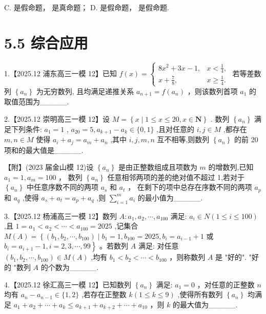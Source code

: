 \documentclass[10pt]{article}
\newcommand*\circled[1]{\tikz[baseline=(char.base)]{\node[shape=circle,draw,inner sep=1.5pt] (char) {\small #1};}}
\begin{document}
C.  \circled{1} 是假命题， \circled{2} 是真命题； D.  \circled{1} 是假命题， \circled{2} 是假命题.

\section*{5.5 综合应用}

1.【2025.12 浦东高三一模 12】已知 \(f\left( x\right)  = \left\{  \begin{array}{ll} 8{x}^{2} + {3x} - 1, & x < \frac{1}{4}, \\  x + \frac{7}{8}, & x \geq  \frac{1}{4}. \end{array}\right.\) 若等差数列 \(\left\{  {a}_{n}\right\}\) 为无穷数列, 且均满足递推关系 \({a}_{n + 1} = f\left( {a}_{n}\right)\) ，则该数列首项 \({a}_{1}\) 的取值范围为\_\_\_\_\_.

2.【2025.12 崇明高三一模 12】设 \(M = \left\{  {x \mid  1 \leq  x \leq  {20},x \in  \mathbf{N}}\right\}\) . 数列 \(\left\{  {a}_{n}\right\}\) 满足下列条件: \({a}_{1} = 1\) , \({a}_{20} = 5,{a}_{k + 1} - {a}_{k} \in  \{ 0,1\}\) ,且对任意的 \(i,j \in  M\) ,都存在 \(m,n \in  M\) 使得 \({a}_{i} + {a}_{j} = {a}_{m} + {a}_{n}\) ,其中 \(i,j,m,n\) 互不相等,则数列 \(\left\{  {a}_{n}\right\}\) 的前 20 项和的最大值是\_\_\_\_\_.

【附】(2023 届金山模 12)设 \(\left\{  {a}_{n}\right\}\) 是由正整数组成且项数为 \(m\) 的增数列,已知 \({a}_{1} = 1,{a}_{m} = {100}\) ， 数列 \(\left\{  {a}_{n}\right\}\) 任意相邻两项的差的绝对值不超过 1,若对于 \(\left\{  {a}_{n}\right\}\) 中任意序数不同的两项 \({a}_{s}\) 和 \({a}_{t}\) ， 在剩下的项中总存在序数不同的两项 \({a}_{p}\) 和 \({a}_{q}\) ,使得 \({a}_{s} + {a}_{t} = {a}_{p} + {a}_{q}\) ,则 \(\mathop{\sum }\limits_{{i = 1}}^{m}{a}_{i}\) 的最小值为\_\_\_\_\_.

3.【2025.12 杨浦高三一模 12】数列 \(A : {a}_{1},{a}_{2},\cdots ,{a}_{100}\) 满足: \({a}_{i} \in  N\left( {1 \leq  i \leq  {100}}\right)\) ,且 \(1 = {a}_{1} < {a}_{2} < \cdots  < {a}_{100} = {2025}\) ,记集合 \(M\left( A\right)  = \left\{  {\left( {{b}_{1},{b}_{2},\cdots ,{b}_{100}}\right)  \mid  {b}_{1} = 1,{b}_{100} = {2025},{b}_{i} = {a}_{i - 1} + 1}\right.\) 或 \(\left. {{b}_{i} = {a}_{i + 1} - 1,i = 2,3,\cdots ,{99}}\right\}\) 。若数列 \(A\) 满足: 对任意 \(\left( {{b}_{1},{b}_{2},\cdots ,{b}_{100}}\right)  \in  M\left( A\right)\) ,均有 \({b}_{1} < {b}_{2} < \cdots  < {b}_{100}\) ，则称数列 \(A\) 是 "好的". "好的 "数列 \(A\) 的个数为\_\_\_\_\_.

4.【2025.12 徐汇高三一模 12】已知数列 \(\left\{  {a}_{n}\right\}\) 满足: \({a}_{1} = 0\) ，对任意的正整数 \(n\) 均有 \({a}_{n} - {a}_{n - 1} \in  \{ 1,2\}\) ,若存在正整数 \(k\left( {1 \leq  k \leq  9}\right)\) ,使得所有数列 \(\left\{  {a}_{n}\right\}\) 均满足 \({a}_{1} + {a}_{2} + \cdots  + {a}_{k} \leq  {a}_{k + 1} + {a}_{k + 2} + \cdots  + {a}_{10}\) ，则 \(k\) 的最大值为\_\_\_\_\_.
\end{document}
